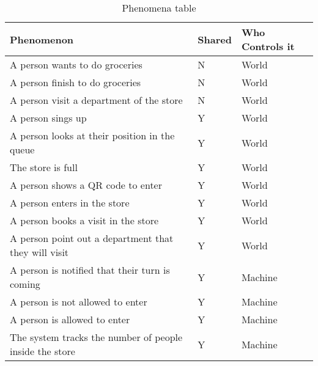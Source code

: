 \begin{table}[H]
    \centering
    \begin{tabular}{| m{} | m{} | m{} |}
        \hline
        \textbf{Phenomenon}                                  & \textbf{Shared} & \textbf{Who Controls it} \\
        \hline
        A person wants to do groceries                          & N               & World                    \\
        \hline
        A person finish to do groceries                         & N               & World                    \\
        \hline
        A person visit a department of the store                & N               & World                    \\
        \hline
        A person sings up                                       & Y               & World                    \\
        \hline
        A person looks at their position in the queue           & Y               & World                    \\
        \hline
        The store is full                                       & Y               & World                    \\
        \hline
        A person shows a QR code to enter                       & Y               & World                    \\
        \hline
        A person enters in the store                            & Y               & World                    \\
        \hline
        A person books a visit in the store                     & Y               & World                    \\
        \hline
        A person point out a department that they will visit    & Y               & World                    \\
        \hline
        A person is notified that their turn is coming          & Y               & Machine                  \\
        \hline
        A person is not allowed to enter                        & Y               & Machine                  \\
        \hline
        A person is allowed to enter                             & Y               & Machine                  \\
        \hline
        The system tracks the number of people inside the store & Y               & Machine                  \\
        \hline
    \end{tabular}
    \caption{Phenomena table}
    \label{tablePhenomenatable}
\end{table}


